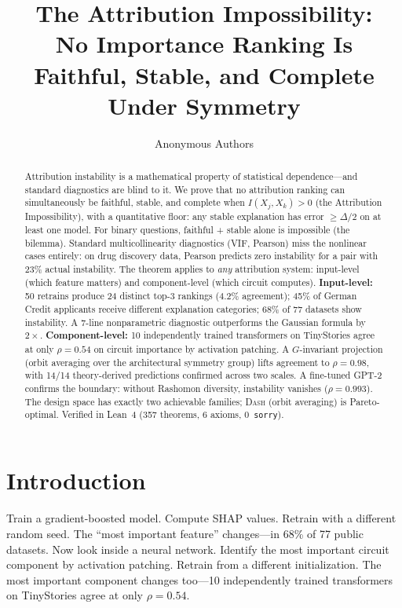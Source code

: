 \documentclass{article}
\title{The Attribution Impossibility:\\{\large No Importance Ranking Is Faithful, Stable, and Complete Under Symmetry}}
\author{Anonymous Authors}
\newcommand{\DASH}{\textsc{Dash}}
\begin{document}
\maketitle

\begin{abstract}
Attribution instability is a mathematical property of statistical dependence---and standard diagnostics are blind to it.
We prove that no attribution ranking can simultaneously be faithful, stable, and complete when $I(X_j, X_k) > 0$ (the Attribution Impossibility), with a quantitative floor: any stable explanation has error ${\geq}\Delta/2$ on at least one model. For binary questions, faithful + stable alone is impossible (the bilemma). Standard multicollinearity diagnostics (VIF, Pearson) miss the nonlinear cases entirely: on drug discovery data, Pearson predicts zero instability for a pair with 23\% actual instability. The theorem applies to \emph{any} attribution system: input-level (which feature matters) and component-level (which circuit computes).
\textbf{Input-level:} 50 retrains produce 24 distinct top-3 rankings (4.2\% agreement); 45\% of German Credit applicants receive different explanation categories; 68\% of 77 datasets show instability. A 7-line nonparametric diagnostic outperforms the Gaussian formula by $2\times$.
\textbf{Component-level:} 10 independently trained transformers on TinyStories agree at only $\rho{=}0.54$ on circuit importance by activation patching. A $G$-invariant projection (orbit averaging over the architectural symmetry group) lifts agreement to $\rho{=}0.98$, with 14/14 theory-derived predictions confirmed across two scales. A fine-tuned GPT-2 confirms the boundary: without Rashomon diversity, instability vanishes ($\rho{=}0.993$).
The design space has exactly two achievable families; \DASH{} (orbit averaging) is Pareto-optimal. Verified in Lean~4 (357 theorems, 6 axioms, 0~\texttt{sorry}).
\end{abstract}

\section{Introduction}
\label{sec:intro}

Train a gradient-boosted model. Compute SHAP values. Retrain with a different random seed. The ``most important feature'' changes---in 68\% of 77 public datasets.
Now look inside a neural network. Identify the most important circuit component by activation patching. Retrain from a different initialization. The most important component changes too---10 independently trained transformers on TinyStories agree at only $\rho = 0.54$.
\end{document}
